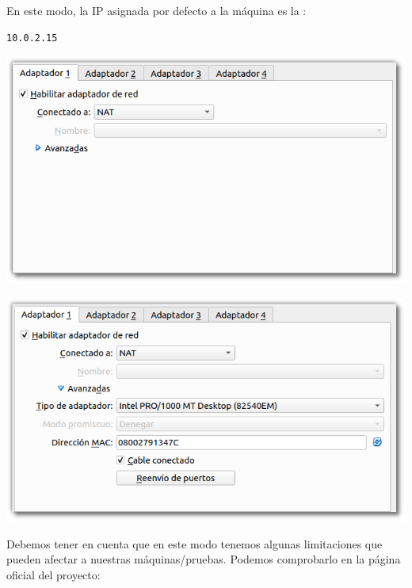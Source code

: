 \documentclass[11pt]{article}
\begin{document}
En este modo, la IP asignada por defecto a la máquina es la :

\begin{verbatim}
10.0.2.15
\end{verbatim}

\begin{center}
\includegraphics[width=.9\linewidth]{imgs/VBoxMenuRed_005_NAT.png}
\end{center}

\begin{center}
\includegraphics[width=.9\linewidth]{imgs/VBoxMenuRed_006_NAT_Ampliado.png}
\end{center}

Debemos tener en cuenta que en este modo tenemos algunas limitaciones
que pueden afectar a nuestras máquinas/pruebas. Podemos comprobarlo en
la página oficial del proyecto:

\end{document}
